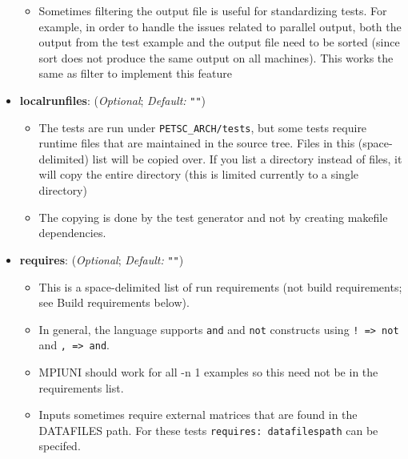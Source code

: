 \begin{itemize}
      \begin{itemize}

      \item Sometimes filtering the output file is useful for standardizing
            tests. For example, in order to handle the issues related to parallel
            output, both the output from the test example and the output file need to be sorted (since
            sort does not produce the same output on all machines).  This works the same as filter to implement this
            feature

      \end{itemize}

    \item[]  \textbf{localrunfiles}: (\emph{Optional}; \emph{Default:} \lstinline{""})

      \begin{itemize}

      \item The tests are run under \lstinline{PETSC_ARCH/tests}, but
            some tests require runtime files that are maintained in the
            source tree.  Files in this (space-delimited) list will be
            copied over. If you list a directory instead of files, it will copy the
            entire directory (this is limited currently to a single directory)

      \item The copying is done by the test generator and not by
            creating makefile dependencies.

      \end{itemize}

    \item[]  \textbf{requires}: (\emph{Optional}; \emph{Default:} \lstinline{""})
      \begin{itemize}

        \item This is a space-delimited list of run requirements (not
        build requirements; see Build requirements below).

        \item In general, the language supports \lstinline{and} and \lstinline{not} constructs
        using \lstinline{! => not} and \lstinline{, => and}.

        \item MPIUNI should work for all -n 1 examples so this need not be in the requirements list.

        \item Inputs sometimes require external matrices that are found in the
        DATAFILES path.   For these
        tests \lstinline{requires: datafilespath} can be specifed.


\end{itemize}
\end{itemize}

